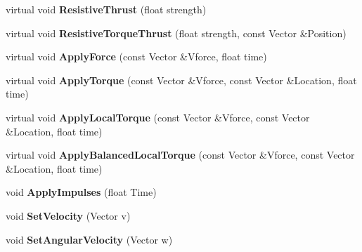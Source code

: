 \begin{DoxyCompactItemize}
\item 
virtual void {\bfseries Resistive\+Thrust} (float strength)\hypertarget{classPhysicsSystem_a53ede108169ec55a276d52f451d53292}{}\label{classPhysicsSystem_a53ede108169ec55a276d52f451d53292}

\item 
virtual void {\bfseries Resistive\+Torque\+Thrust} (float strength, const Vector \&Position)\hypertarget{classPhysicsSystem_aa476b77f11bc214537d3ebed263278d9}{}\label{classPhysicsSystem_aa476b77f11bc214537d3ebed263278d9}

\item 
virtual void {\bfseries Apply\+Force} (const Vector \&Vforce, float time)\hypertarget{classPhysicsSystem_a24cc2fe215911427951d8bd267f18665}{}\label{classPhysicsSystem_a24cc2fe215911427951d8bd267f18665}

\item 
virtual void {\bfseries Apply\+Torque} (const Vector \&Vforce, const Vector \&Location, float time)\hypertarget{classPhysicsSystem_a207d54bb69123f9d79c65d4664ba5564}{}\label{classPhysicsSystem_a207d54bb69123f9d79c65d4664ba5564}

\item 
virtual void {\bfseries Apply\+Local\+Torque} (const Vector \&Vforce, const Vector \&Location, float time)\hypertarget{classPhysicsSystem_ae00c874b4315fb1934e46b248df01f74}{}\label{classPhysicsSystem_ae00c874b4315fb1934e46b248df01f74}

\item 
virtual void {\bfseries Apply\+Balanced\+Local\+Torque} (const Vector \&Vforce, const Vector \&Location, float time)\hypertarget{classPhysicsSystem_a22ac235e9655108e48cbfbf852b9f3ce}{}\label{classPhysicsSystem_a22ac235e9655108e48cbfbf852b9f3ce}

\item 
void {\bfseries Apply\+Impulses} (float Time)\hypertarget{classPhysicsSystem_a29e04e493d36a8c7b98f242b16b69659}{}\label{classPhysicsSystem_a29e04e493d36a8c7b98f242b16b69659}

\item 
void {\bfseries Set\+Velocity} (Vector v)\hypertarget{classPhysicsSystem_ae92573d8766dd0d75ca70845d73b4913}{}\label{classPhysicsSystem_ae92573d8766dd0d75ca70845d73b4913}

\item 
void {\bfseries Set\+Angular\+Velocity} (Vector w)\hypertarget{classPhysicsSystem_a38c0cf8ca73184fb89006c66e3759eeb}{}\label{classPhysicsSystem_a38c0cf8ca73184fb89006c66e3759eeb}


\end{DoxyCompactItemize}
